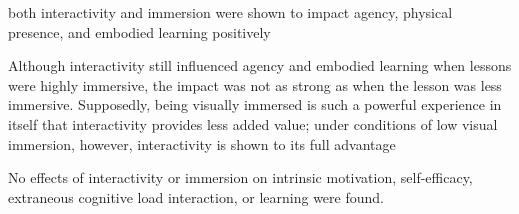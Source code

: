 both interactivity and immersion were shown to impact agency, physical presence, and embodied learning positively

Although interactivity still influenced agency and embodied learning when lessons were highly immersive, the impact was not as strong as when the lesson was less immersive. Supposedly, being visually immersed is such a powerful experience in itself that interactivity provides less added value; under conditions of low visual immersion, however, interactivity is shown to its full advantage

No effects of interactivity or immersion on intrinsic motivation, self-efficacy, extraneous cognitive load interaction, or learning were found.